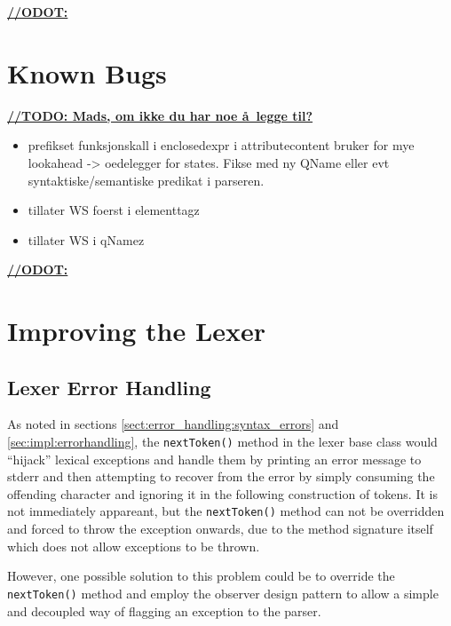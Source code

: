 \underline{\textbf{\LARGE //ODOT:}}

\section{Known Bugs}
\label{sect:future:knownBugs}

\underline{\textbf{\LARGE //TODO: Mads, om ikke du har noe \aa~legge til?}}
\begin{itemize}
		\item prefikset funksjonskall i enclosedexpr i attributecontent bruker for mye lookahead -> oedelegger for states. Fikse med ny QName eller evt syntaktiske/semantiske predikat i parseren.
		\item tillater WS foerst i elementtagz
		\item tillater WS i qNamez
	\end{itemize}

\underline{\textbf{\LARGE //ODOT:}}


\section{Improving the Lexer}



\subsection{Lexer Error Handling}
\label{sect:future_work:lexer_error_handling}
As noted in sections \ref{sect:error_handling:syntax_errors} and
\ref{sec:impl:errorhandling}, the \verb!nextToken()! method in the lexer base class
would ``hijack'' lexical exceptions and handle them by printing an error message
to stderr and then attempting to recover from the error by simply consuming the
offending character and ignoring it in the following construction of tokens. It is 
not immediately appareant, but the \verb!nextToken()! method can not be overridden and
forced to throw the exception onwards, due to the method signature itself which
does not allow exceptions to be thrown. 

However, one possible solution to this problem could be to override the \verb!nextToken()! method and employ the observer design pattern to allow a simple and decoupled way of flagging an exception to the parser.
